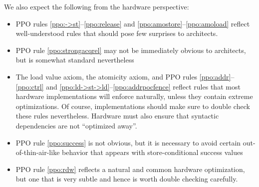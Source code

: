 We also expect the following from the hardware perspective:
\begin{itemize}
  \item PPO rules \ref{ppo:->st}--\ref{ppo:release} and \ref{ppo:amostore}--\ref{ppo:amoload} reflect well-understood rules that should pose few surprises to architects.
  \item PPO rule \ref{ppo:strongacqrel} may not be immediately obvious to architects, but is somewhat standard nevertheless
  \item The load value axiom, the atomicity axiom, and PPO rules \ref{ppo:addr}--\ref{ppo:ctrl} and \ref{ppo:ld->st->ld}--\ref{ppo:addrpocfence} reflect rules that most hardware implementations will enforce naturally, unless they contain extreme optimizations.  Of course, implementations should make sure to double check these rules nevertheless.  Hardware must also ensure that syntactic dependencies are not ``optimized away''.
  \item PPO rule \ref{ppo:success} is not obvious, but it is necessary to avoid certain out-of-thin-air-like behavior that appears with store-conditional success values
  \item PPO rule \ref{ppo:rdw} reflects a natural and common hardware optimization, but one that is very subtle and hence is worth double checking carefully.
\end{itemize}

